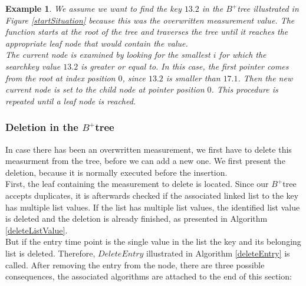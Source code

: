 \documentclass[abstracton,12pt]{scrreprt}
\newtheorem{example}{Example}
\begin{document}
\begin{example}
	We assume we want to find the key $13.2$ in the $B^+$tree illustrated in Figure \ref{startSituation} because this was the overwritten measurement value. The function starts at the root of the tree and traverses the tree until it reaches the appropriate leaf node that would contain the value.\\
	The current node is examined by looking for the smallest $i$ for which the searchkey value $13.2$ is greater or equal to.  In this case, the first pointer comes from the root at index position $0$, since $13.2$ is smaller than $17.1$. Then the new current node is set to the child node at pointer position $0$. This procedure is repeated until a leaf node is reached. 
\end{example} 

\subsubsection{Deletion in the $B^+$tree}
\label{delete}
In case there has been an overwritten measurement, we first have to delete this measurment from the tree, before we can add a new one. We first present the deletion, because it is normally executed before the insertion. \\
First, the leaf containing the measurement to delete is located. Since our $B^+$tree accepts duplicates, it is afterwards checked if the associated linked list to the key has multiple list values. If the list has multiple list values, the identified list value is deleted and the deletion is already finished, as presented in Algorithm \ref{deleteListValue}. \\
But if the entry time point is the single value in the list the key and its belonging list is deleted. Therefore, $DeleteEntry$ illustrated in Algorithm \ref{deleteEntry} is called. After removing the entry from the node, there are three possible consequences, the associated algorithms are attached to the end of this section:
\end{document}
